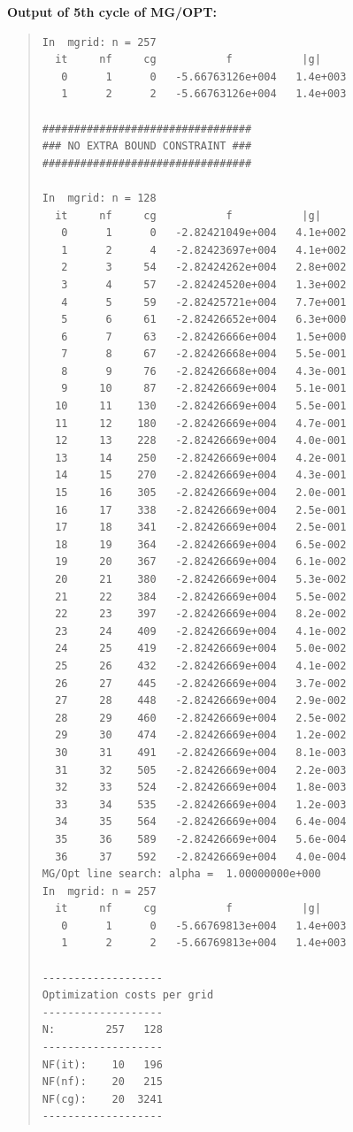 \documentclass[10pt]{article}
\begin{document}
\bf{Output of 5th cycle of MG/OPT:}
\begin{quote}
\begin{verbatim}
In  mgrid: n = 257
  it     nf     cg           f           |g|
   0      1      0   -5.66763126e+004   1.4e+003
   1      2      2   -5.66763126e+004   1.4e+003
 
#################################
### NO EXTRA BOUND CONSTRAINT ###
#################################
 
In  mgrid: n = 128
  it     nf     cg           f           |g|
   0      1      0   -2.82421049e+004   4.1e+002
   1      2      4   -2.82423697e+004   4.1e+002
   2      3     54   -2.82424262e+004   2.8e+002
   3      4     57   -2.82424520e+004   1.3e+002
   4      5     59   -2.82425721e+004   7.7e+001
   5      6     61   -2.82426652e+004   6.3e+000
   6      7     63   -2.82426666e+004   1.5e+000
   7      8     67   -2.82426668e+004   5.5e-001
   8      9     76   -2.82426668e+004   4.3e-001
   9     10     87   -2.82426669e+004   5.1e-001
  10     11    130   -2.82426669e+004   5.5e-001
  11     12    180   -2.82426669e+004   4.7e-001
  12     13    228   -2.82426669e+004   4.0e-001
  13     14    250   -2.82426669e+004   4.2e-001
  14     15    270   -2.82426669e+004   4.3e-001
  15     16    305   -2.82426669e+004   2.0e-001
  16     17    338   -2.82426669e+004   2.5e-001
  17     18    341   -2.82426669e+004   2.5e-001
  18     19    364   -2.82426669e+004   6.5e-002
  19     20    367   -2.82426669e+004   6.1e-002
  20     21    380   -2.82426669e+004   5.3e-002
  21     22    384   -2.82426669e+004   5.5e-002
  22     23    397   -2.82426669e+004   8.2e-002
  23     24    409   -2.82426669e+004   4.1e-002
  24     25    419   -2.82426669e+004   5.0e-002
  25     26    432   -2.82426669e+004   4.1e-002
  26     27    445   -2.82426669e+004   3.7e-002
  27     28    448   -2.82426669e+004   2.9e-002
  28     29    460   -2.82426669e+004   2.5e-002
  29     30    474   -2.82426669e+004   1.2e-002
  30     31    491   -2.82426669e+004   8.1e-003
  31     32    505   -2.82426669e+004   2.2e-003
  32     33    524   -2.82426669e+004   1.8e-003
  33     34    535   -2.82426669e+004   1.2e-003
  34     35    564   -2.82426669e+004   6.4e-004
  35     36    589   -2.82426669e+004   5.6e-004
  36     37    592   -2.82426669e+004   4.0e-004
MG/Opt line search: alpha =  1.00000000e+000
In  mgrid: n = 257
  it     nf     cg           f           |g|
   0      1      0   -5.66769813e+004   1.4e+003
   1      2      2   -5.66769813e+004   1.4e+003

-------------------
Optimization costs per grid
-------------------
N:        257   128
-------------------
NF(it):    10   196
NF(nf):    20   215
NF(cg):    20  3241
-------------------
\end{verbatim}
\end{quote}
\end{document}
